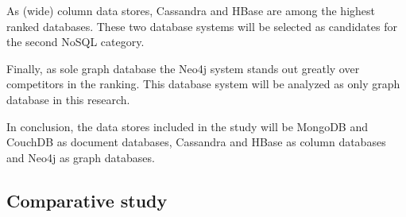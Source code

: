 As (wide) column data stores, Cassandra \autocite{Cassandra2008} and HBase \autocite{HBase2005} are among the highest ranked databases. These two database systems will be selected as candidates for the second NoSQL category.

Finally, as sole graph database the Neo4j system \autocite{Neo4j2007} stands out greatly over competitors in the ranking. This database system will be analyzed as only graph database in this research.

In conclusion, the data stores included in the study will be MongoDB and CouchDB as document databases, Cassandra and HBase as column databases and Neo4j as graph databases.

\subsection{Comparative study}
\label{sec:comparative study}


